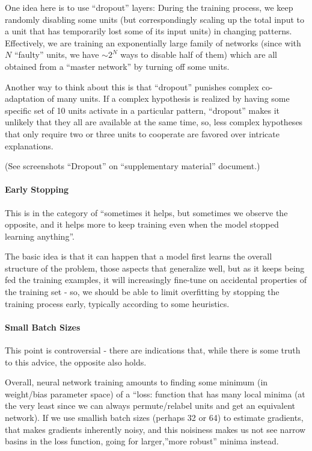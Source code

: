 \documentclass[11pt]{article}
\begin{document}
One idea here is to use ``dropout'' layers: During the training process,
we keep randomly disabling some units (but correspondingly scaling up
the total input to a unit that has temporarily lost some of its input
units) in changing patterns. Effectively, we are training an
exponentially large family of networks (since with \(N\) ``faulty''
units, we have \(\sim 2^N\) ways to disable half of them) which are all
obtained from a ``master network'' by turning off some units.

Another way to think about this is that ``dropout'' punishes complex
co-adaptation of many units. If a complex hypothesis is realized by
having some specific set of 10 units activate in a particular pattern,
``dropout'' makes it unlikely that they all are available at the same
time, so, less complex hypotheses that only require two or three units
to cooperate are favored over intricate explanations.

(See screenshots ``Dropout'' on ``supplementary material'' document.)

\hypertarget{early-stopping}{%
\paragraph{\texorpdfstring{\textbf{Early
Stopping}}{Early Stopping}}\label{early-stopping}}

This is in the category of ``sometimes it helps, but sometimes we
observe the opposite, and it helps more to keep training even when the
model stopped learning anything''.

The basic idea is that it can happen that a model first learns the
overall structure of the problem, those aspects that generalize well,
but as it keeps being fed the training examples, it will increasingly
fine-tune on accidental properties of the training set - so, we should
be able to limit overfitting by stopping the training process early,
typically according to some heuristics.

\hypertarget{small-batch-sizes}{%
\paragraph{\texorpdfstring{\textbf{Small Batch
Sizes}}{Small Batch Sizes}}\label{small-batch-sizes}}

This point is controversial - there are indications that, while there is
some truth to this advice, the opposite also holds.

Overall, neural network training amounts to finding some minimum (in
weight/bias parameter space) of a ``loss: function that has many local
minima (at the very least since we can always permute/relabel units and
get an equivalent network). If we use smallish batch sizes (perhaps 32
or 64) to estimate gradients, that makes gradients inherently noisy, and
this noisiness makes us not see narrow basins in the loss function,
going for larger,''more robust'' minima instead.
\end{document}
